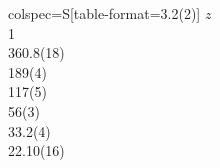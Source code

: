 \begin{tblr}{colspec={S[table-format=3.2(2)]}}
{{{$z$}}}\\
{{{\si{1}}}}\\
360.8(18)\\
189(4)\\
117(5)\\
56(3)\\
33.2(4)\\
22.10(16)\\
\end{tblr}
